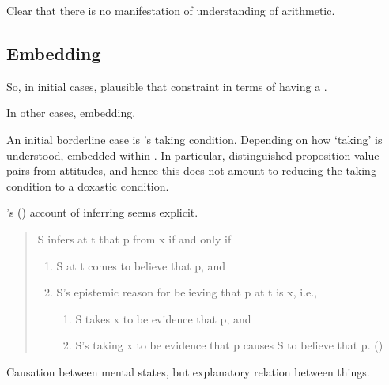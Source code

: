 \begin{note}[Illustration]
  Clear that there is no manifestation of understanding of arithmetic.
\end{note}

\subsection{Embedding}
\label{sec:embedding}

\begin{note}
  So, in initial cases, plausible that constraint in terms of having a \witness{}.

  In other cases, embedding.
\end{note}

\begin{note}
  An initial borderline case is \citeauthor{Boghossian:2014aa}'s taking condition.
  Depending on how `taking' is understood, embedded within \ros{}.
  In particular, distinguished proposition-value pairs from attitudes, and hence this does not amount to reducing the taking condition to a doxastic condition.
\end{note}

\begin{note}
    \citeauthor{Longino:1978wv}'s (\citeyear{Longino:1978wv}) account of inferring seems explicit.
  \begin{quote}
    S infers at t that p from x if and only if
    \begin{enumerate}[label=\arabic*]
    \item
      S at t comes to believe that p, and
    \item
      S's epistemic reason for believing that p at t is x, i.e.,
      \begin{enumerate}[label=\alph*]
      \item
        S takes x to be evidence that p, and
      \item
        S's taking x to be evidence that p causes S to believe that p.\newline
        \mbox{}\hfill\mbox{(\citeyear[22]{Longino:1978wv})}
      \end{enumerate}
    \end{enumerate}
  \end{quote}
  Causation between mental states, but explanatory relation between things.
\end{note}

